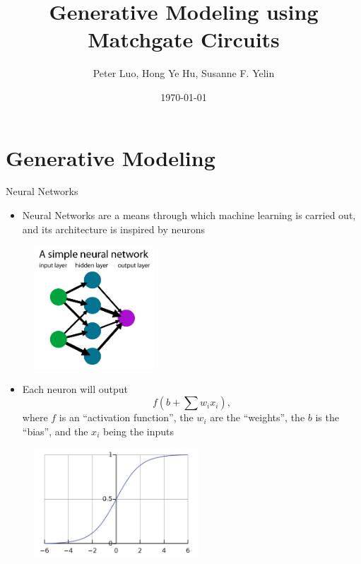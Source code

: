 \documentclass[xcolor=dvipsnames]{beamer}
\title[Modeling using Matchgates]{Generative Modeling using Matchgate Circuits}
\author{Peter Luo, Hong Ye Hu, Susanne F. Yelin}
\date{\today}
\begin{document}
\frame{\titlepage}

\section{Generative Modeling}

\begin{frame}{Neural Networks}

  \begin{itemize}
    \item Neural Networks are a means through which machine learning is carried out, and its architecture is inspired by neurons
  \end{itemize}
  \begin{figure}
    \centering
    \includegraphics[width=0.4\textwidth]{NN.png}
  \end{figure}

\end{frame}

\begin{frame}{}
  \begin{itemize}
    \item Each neuron will output 
    $$f\left(b+\sum w_ix_i\right),$$
    where $f$ is an ``activation function'', the $w_i$ are the ``weights'', the $b$ is the ``bias'', and the $x_i$ being the inputs
  \end{itemize}
  \begin{figure}
    \centering
    \includegraphics[width=0.55\textwidth]{sigmoid.png}
  \end{figure}

\end{frame}
\end{document}
